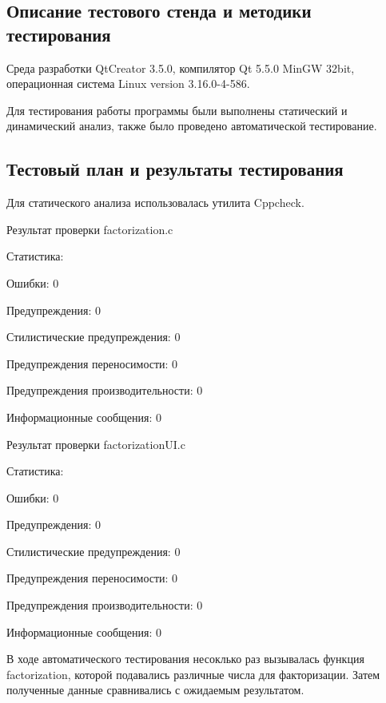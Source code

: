 \documentclass[12pt,a4paper]{report}
\begin{document}
\subsection{Описание тестового стенда и методики тестирования}

Среда разработки QtCreator 3.5.0, компилятор Qt 5.5.0 MinGW 32bit, операционная система Linux version 3.16.0-4-586.

Для тестирования работы программы были выполнены статический и динамический анализ, также было проведено автоматической тестирование.

\subsection{Тестовый план и результаты тестирования}

	Для статического анализа использовалась утилита Cppcheck.
	
	\vspace{\baselineskip}
	Результат проверки factorization.c 
	
	Статистика:
	
	Ошибки:	0
	
	Предупреждения:	0
	
	Стилистические предупреждения:	0
	
	Предупреждения переносимости:	0
	
	Предупреждения производительности:	0
	
	Информационные сообщения:	0
	
	
	\vspace{\baselineskip}
	
	
	Результат проверки factorizationUI.c 
	
	Статистика:
	
	Ошибки:	0
	
	Предупреждения:	0
	
	Стилистические предупреждения:	0
	
	Предупреждения переносимости:	0
	
	Предупреждения производительности:	0
	
	Информационные сообщения:	0
	
	

	\vspace{\baselineskip}
	
	В ходе автоматического тестирования несоклько раз вызывалась функция factorization, которой подавались различные числа для факторизации. Затем полученные данные сравнивались с ожидаемым результатом. 
	 
\end{document}
